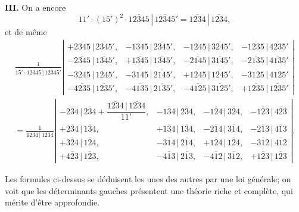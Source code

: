 \documentclass[11pt,a4paper]{book}
\begin{document}
\medskip

\textbf{III.} On a encore
\[
11' \cdot (15')^2 \cdot \overline{12345}\,|\,\overline{12345}'
= \overline{1234}\,|\,\overline{1234},
\]
et de m\^eme
\begin{multline*}
\frac{1}{15' \cdot \overline{12345}\,|\,\overline{12345}'}
\left|
\begin{array}{cccc}
+\overline{2345}\,|\,\overline{2345}', & -\overline{1345}\,|\,\overline{2345}', &
-\overline{1245}\,|\,\overline{3245}', & -\overline{1235}\,|\,\overline{4235}' \\
-\overline{2345}\,|\,\overline{1345}', & +\overline{1345}\,|\,\overline{1345}', &
-\overline{2145}\,|\,\overline{3145}', & -\overline{2135}\,|\,\overline{4135}' \\
-\overline{3245}\,|\,\overline{1245}', & -\overline{3145}\,|\,\overline{2145}', &
+\overline{1245}\,|\,\overline{1245}', & -\overline{3125}\,|\,\overline{4125}' \\
-\overline{4235}\,|\,\overline{1235}', & -\overline{4135}\,|\,\overline{2135}', &
-\overline{4125}\,|\,\overline{3125}', & +\overline{1235}\,|\,\overline{1235}'
\end{array}
\right| \\
=
\frac{1}{\overline{1234}\,|\,\overline{1234}}
\left|
\begin{array}{cccc}
-\overline{234}\,|\,\overline{234} + \dfrac{\overline{1234}\,|\,\overline{1234}}{11'}, &
-\overline{134}\,|\,\overline{234}, & -\overline{124}\,|\,\overline{324}, &
-\overline{123}\,|\,\overline{423} \\
+\overline{234}\,|\,\overline{134}, & +\overline{134}\,|\,\overline{134}, &
-\overline{214}\,|\,\overline{314}, & -\overline{213}\,|\,\overline{413} \\
+\overline{324}\,|\,\overline{124}, & -\overline{314}\,|\,\overline{214}, &
+\overline{124}\,|\,\overline{124}, & -\overline{312}\,|\,\overline{412} \\
+\overline{423}\,|\,\overline{123}, & -\overline{413}\,|\,\overline{213}, &
-\overline{412}\,|\,\overline{312}, & +\overline{123}\,|\,\overline{123}
\end{array}
\right|.
\end{multline*}

\medskip

Les formules ci-dessus se d\'eduisent les unes des autres par une loi
g\'en\'erale; on voit que les d\'eterminants gauches pr\'esentent une
th\'eorie riche et compl\`ete, qui m\'erite d'\^etre approfondie.
\end{document}
